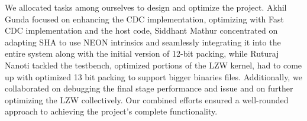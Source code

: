 \documentclass[../main.tex]{subfiles}
\begin{document}
\noindent We allocated tasks among ourselves to design and optimize the project. Akhil Gunda focused on enhancing the CDC implementation, optimizing with Fast CDC implementation and the host code, Siddhant Mathur concentrated on adapting SHA to use NEON intrinsics and seamlessly integrating it into the entire system along with the initial version of 12-bit packing, while Ruturaj Nanoti tackled the testbench, optimized portions of the LZW kernel, had to come up with optimized 13 bit packing to support bigger binaries files. Additionally, we collaborated on debugging the final stage performance and issue and on further optimizing the LZW collectively. Our combined efforts ensured a well-rounded approach to achieving the project's complete functionality.
\end{document}
